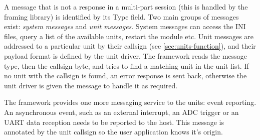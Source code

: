 A message that is not a response in a multi-part session (this is handled by the framing library) is identified by its Type field. Two main groups of messages exist: \textit{system messages} and \textit{unit messages}. System messages can access the INI files, query a list of the available units, restart the module etc. Unit messages are addressed to a particular unit by their callsign (see \ref{sec:units-function}), and their payload format is defined by the unit driver. The framework reads the message type, then the callsign byte, and tries to find a matching unit in the unit list. If no unit with the callsign is found, an error response is sent back, otherwise the unit driver is given the message to handle it as required.

The framework provides one more messaging service to the units: event reporting. An asynchronous event, such as an external interrupt, an ADC trigger or an UART data reception needs to be reported to the host. This message is annotated by the unit callsign so the user application knows it's origin.




